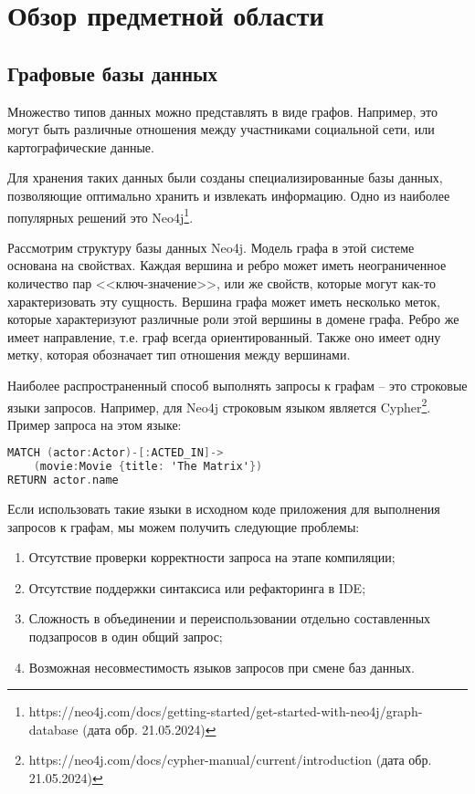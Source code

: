 \chapter{Обзор предметной области}
\label{ch:ch1}

\section{Графовые базы данных}
Множество типов данных можно представлять в виде графов.
Например, это могут быть различные отношения между участниками социальной сети, или картографические данные.

Для хранения таких данных были созданы специализированные базы данных, позволяющие оптимально хранить и извлекать информацию. Одно из наиболее популярных решений это Neo4j\footnote{https://neo4j.com/docs/getting-started/get-started-with-neo4j/graph-database (дата обр. 21.05.2024)}.

Рассмотрим структуру базы данных Neo4j.
Модель графа в этой системе основана на свойствах.
Каждая вершина и ребро может иметь неограниченное количество пар <<ключ-значение>>, или же свойств, которые могут как-то характеризовать эту сущность.
Вершина графа может иметь несколько меток, которые характеризуют различные роли этой вершины в домене графа.
Ребро же имеет направление, т.е. граф всегда ориентированный. Также оно имеет одну метку, которая обозначает тип отношения между вершинами.

Наиболее распространенный способ выполнять запросы к графам -- это строковые языки запросов.
Например, для Neo4j строковым языком является Cypher\footnote{https://neo4j.com/docs/cypher-manual/current/introduction (дата обр. 21.05.2024)}.
Пример запроса на этом языке:

\begin{nobreaks}
    \begin{lstlisting}[language=C]
MATCH (actor:Actor)-[:ACTED_IN]->
    (movie:Movie {title: 'The Matrix'})
RETURN actor.name
\end{lstlisting}
\end{nobreaks}

Если использовать такие языки в исходном коде приложения для выполнения запросов к графам, мы можем получить следующие проблемы:
\begin{enumerate}
    \item Отсутствие проверки корректности запроса на этапе компиляции;
    \item Отсутствие поддержки синтаксиса или рефакторинга в IDE;
    \item Сложность в объединении и переиспользовании отдельно составленных подзапросов в один общий запрос;
    \item Возможная несовместимость языков запросов при смене баз данных.
\end{enumerate}

